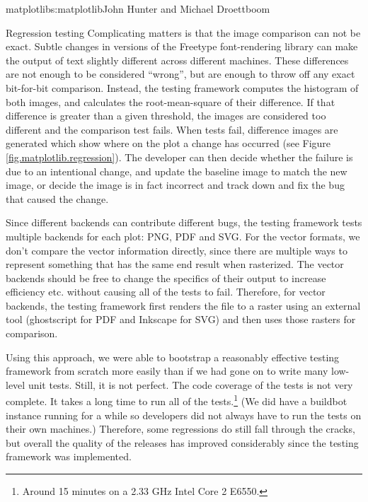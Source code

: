 \begin{aosachapter}{matplotlib}{s:matplotlib}{John Hunter and Michael Droettboom}
\begin{aosasect1}{Regression testing}
Complicating matters is that the image comparison can not be exact.
Subtle changes in versions of the Freetype font-rendering library can
make the output of text slightly different across different machines.
These differences are not enough to be considered ``wrong'', but are
enough to throw off any exact bit-for-bit comparison.  Instead, the
testing framework computes the histogram of both images, and
calculates the root-mean-square of their difference.  If that
difference is greater than a given threshold, the images are
considered too different and the comparison test fails.  When tests
fail, difference images are generated which show where on the plot a
change has occurred (see Figure \ref{fig.matplotlib.regression}).  The
developer can then decide whether the failure is due to an intentional
change, and update the baseline image to match the new image, or
decide the image is in fact incorrect and track down and fix the bug
that caused the change.


Since different backends can contribute different bugs, the testing
framework tests multiple backends for each plot: PNG, PDF and SVG.
For the vector formats, we don't compare the vector information
directly, since there are multiple ways to represent something that
has the same end result when rasterized.  The vector backends should
be free to change the specifics of their output to increase efficiency
etc. without causing all of the tests to fail.  Therefore, for vector
backends, the testing framework first renders the file to a raster
using an external tool (ghostscript for PDF and Inkscape for SVG) and
then uses those rasters for comparison.

Using this approach, we were able to bootstrap a reasonably effective
testing framework from scratch more easily than if we had gone on to
write many low-level unit tests.  Still, it is not perfect.  The code
coverage of the tests is not very complete.  It takes a long time to
run all of the tests.\footnote{Around 15 minutes on a 2.33 GHz Intel
  Core 2 E6550.}  (We did have a buildbot instance running for a while
so developers did not always have to run the tests on their own
machines.)  Therefore, some regressions do still fall through the
cracks, but overall the quality of the releases has improved
considerably since the testing framework was implemented.

\end{aosasect1}

\end{aosachapter}


